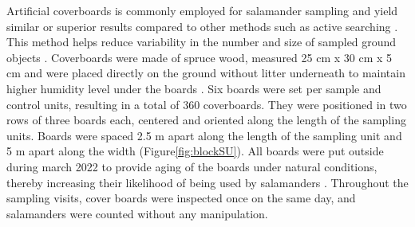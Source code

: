 Artificial coverboards is commonly employed for salamander sampling and yield similar or superior results compared to other methods such as active searching \citep{hydeSamplingPlethodontidSalamanders2001,mooreComparisonPopulationEastern2009c}. 
This method helps reduce variability in the number and size of sampled ground objects \citep{hydeSamplingPlethodontidSalamanders2001}. 
Coverboards were made of spruce wood, measured 25 cm x 30 cm x 5 cm and were placed directly on the ground without litter underneath to maintain higher humidity level under the boards \citep{mazerolleWoodlandSalamanderPopulation2021a}. 
Six boards were set per sample and control units, resulting in a total of 360 coverboards.
They were positioned in two rows of three boards each, centered and oriented along the length of the sampling units.
Boards were spaced 2.5 m apart along the length of the sampling unit and 5 m apart along the width (Figure\ref{fig:blockSU}).
All boards were put outside during march 2022 to provide aging of the boards under natural conditions, thereby increasing their likelihood of being used by salamanders \citep{hedrickEffectsCoverboardAge2021,smithEffectsCoverBoard2014a}.
Throughout the sampling visits, cover boards were inspected once on the same day, and salamanders were counted without any manipulation.

